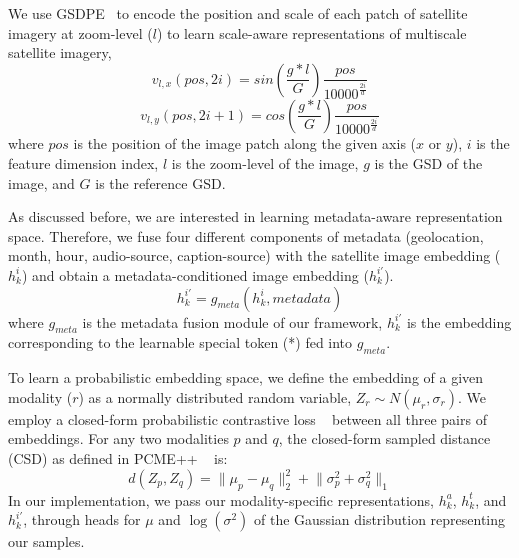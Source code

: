 We use GSDPE~\cite{reed2023scale} to encode the position and scale of each patch of satellite imagery at zoom-level ($l$) to learn scale-aware representations of multiscale satellite imagery,
\begin{equation}\label{eq:9}
v_{l,x}(pos,2i) = sin(\frac{g*l}{G})\frac{pos}{10000^{\frac{2i}{d}}}
\end{equation}
\begin{equation}\label{eq:10}
v_{l,y}(pos,2i+1) = cos(\frac{g*l}{G})\frac{pos}{10000^{\frac{2i}{d}}}
\end{equation} where $pos$ is the position of the image patch along the given axis ($x$ or $y$), $i$ is the feature dimension index, $l$ is the zoom-level of the image, $g$ is the GSD of the image, and $G$ is the reference GSD. %


As discussed before, we are interested in learning metadata-aware representation space. Therefore, we fuse four different components of metadata (geolocation, month, hour, audio-source, caption-source) with the satellite image embedding ($h_{k}^{i}$) and obtain a metadata-conditioned image embedding ($h_{k}^{i'}$).
\begin{equation}\label{eq:11}
h_{k}^{i'} = g_{meta}(h_{k}^{i}, metadata)
\end{equation}
%
where $g_{meta}$ is the metadata fusion module of our framework, $h_{k}^{i'}$ is the embedding corresponding to the learnable special token (*) fed into $g_{meta}$.

To learn a probabilistic embedding space, we define the embedding of a given modality ($r$) as a normally distributed random variable, $Z_{r}\sim N(\mu_{r}, \sigma_{r})$. We employ a closed-form probabilistic contrastive loss ~\cite {chun2023improved} between all three pairs of embeddings.  For any two modalities $p$ and $q$, the closed-form sampled distance (CSD) as defined in PCME++ ~\cite{chun2023improved} is:
%
\begin{equation}\label{eq:12}
d(Z_{p},Z_{q})  %
= \lVert \mu_{p} -\mu_{q}\rVert ^{2}_{2} + \lVert \sigma_{p}^{2} +\sigma_{q}^{2}\rVert _{1}
\end{equation}
%
In our implementation, we pass our modality-specific representations, $h_{k}^{a}$, $h_{k}^{t}$, and $h_{k}^{i'}$, through heads for $\mu$ and $\log(\sigma^{2})$ of the Gaussian distribution representing our samples.

